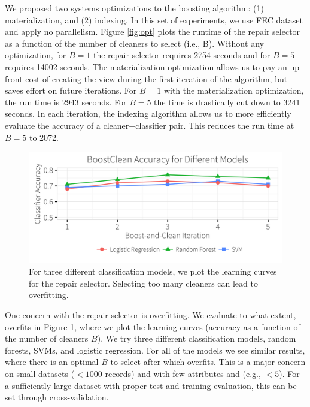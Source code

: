   We proposed two systems optimizations to the boosting algorithm: (1) materialization, and (2) indexing.
 In this set of experiments, we use FEC dataset and apply no parallelism.
 Figure \ref{fig:opt} plots the runtime of the repair selector as a function of the number of cleaners to select (i.e., B).
 Without any optimization, for $B=1$ the repair selector requires 2754 seconds and for $B=5$ requires 14002 seconds.
 The materialization optimization allows us to pay an up-front cost of creating the view during the first iteration of the algorithm, but saves effort on future iterations.
 For $B=1$ with the materialization optimization, the run time is 2943 seconds.
 For $B=5$ the time is drastically cut down to 3241 seconds.
 In each iteration, the indexing algorithm allows us to more efficiently evaluate the accuracy of a cleaner+classifier pair.
 This reduces the run time at $B=5$ to 2072.
 
 \begin{figure}[t]
\centering
 \includegraphics[width=0.9\columnwidth]{exp/learn.png}
 \caption{For three different classification models, we plot the learning curves for the repair selector. Selecting too many cleaners can lead to overfitting.
 \label{fig:learning}}
\end{figure}
 
 One concern with the repair selector is overfitting. We evaluate to what extent, \sys overfits in Figure \ref{fig:learning}, where we plot the learning curves (accuracy as a function of the number of cleaners $B$).
 We try three different classification models, random forests, SVMs, and logistic regression.
 For all of the models we see similar results, where there is an optimal $B$ to select after which \sys overfits.
This is a major concern on small datasets ($<1000$ records) and with few attributes and (e.g., $<5$). 
For a sufficiently large dataset with proper test and training evaluation, this can be set through cross-validation. 


 


